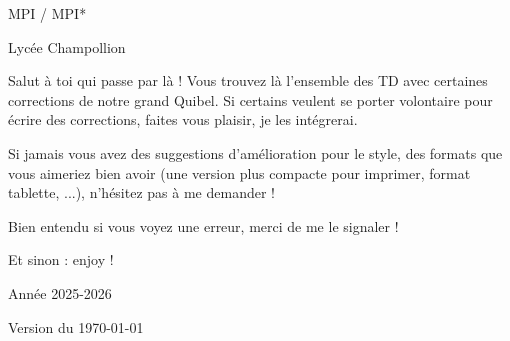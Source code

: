 \documentclass{../commun/prepacours}
\begin{document}
\begin{center}
  \vspace*{2cm}
  
  
  \vspace{1.5cm}
  {\Large MPI / MPI* \par}
  \vspace{0.5cm}
  {\large Lycée Champollion \par}
  \vspace{2cm}
  
  \begin{minipage}{0.8\textwidth}
    \vspace{0.5cm}
    
    Salut à toi qui passe par là ! Vous trouvez là l'ensemble des TD avec certaines corrections de notre grand Quibel. 
    Si certains veulent se porter volontaire pour écrire des corrections, faites 
    vous plaisir, je les intégrerai. 

    \avspace Si jamais vous avez des suggestions d'amélioration pour le style, 
    des formats que vous aimeriez bien avoir (une version plus compacte pour 
    imprimer, format tablette, ...), n'hésitez pas à me demander !

    \avspace Bien entendu si vous voyez une erreur, merci de me le signaler !

    \begin{center}
      Et sinon : enjoy !
    \end{center}
    
    \vspace{0.5cm}
  \end{minipage}
  
  \vfill
  {\Large Année 2025-2026 \par}
  \vspace{0.5cm}
  {\normalsize Version du \today \par}
  \vspace{1cm}
\end{center}
\clearpage
\end{document}
